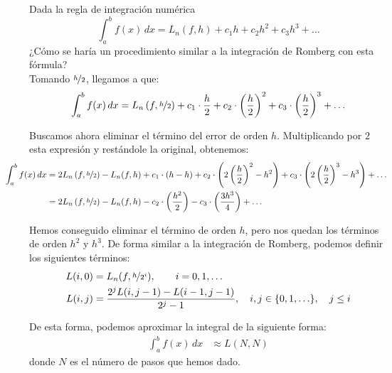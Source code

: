 \begin{ejercicio}
    Dada la regla de integración numérica
    \begin{equation*}
        \int_a^b f(x) \, dx = L_n(f, h) + c_1 h + c_2 h^2 + c_3 h^3 + \ldots
    \end{equation*}
    ¿Cómo se haría un procedimiento similar a la integración de Romberg con esta fórmula?\\


    Tomando $\nicefrac{h}{2}$, llegamos a que:
    \begin{align*}
        \int_a^b f(x) \, dx &= L_n\left(f,\nicefrac{h}{2}\right) + c_1 \cdot \frac{h}{2} + c_2 \cdot \left(\frac{h}{2}\right)^2 + c_3 \cdot \left(\frac{h}{2}\right)^3 + \ldots\\
    \end{align*}

    Buscamos ahora eliminar el término del error de orden $h$. Multiplicando por $2$ esta expresión y restándole la original, obtenemos:
    \begin{align*}
        \hspace{-1cm}\int_a^b f(x) \, dx &= 2L_n\left(f,\nicefrac{h}{2}\right) - L_n(f, h) + c_1 \cdot \left(h-h\right) + c_2 \cdot \left(2\left(\frac{h}{2}\right)^2 - h^2\right) + c_3 \cdot \left(2\left(\frac{h}{2}\right)^3 - h^3\right) + \ldots\\
        \hspace{-1cm}&= 2L_n\left(f,\nicefrac{h}{2}\right) - L_n(f, h) - c_2 \cdot \left(\frac{h^2}{2}\right) - c_3 \cdot \left(\frac{3h^3}{4}\right) + \ldots
    \end{align*}

    Hemos conseguido eliminar el término de orden $h$, pero nos quedan los términos de orden $h^2$ y $h^3$. De forma similar a la integración de Romberg, podemos definir los siguientes términos:
    \begin{align*}
        L(i,0) &= L_n(f, \nicefrac{h}{2^i}),\qquad i=0,1,\ldots\\
        L(i,j) &= \dfrac{2^jL(i,j-1)-L(i-1,j-1)}{2^j-1}, \quad i,j\in \{0,1,\ldots\}, \quad j\leq i\\
    \end{align*}

    De esta forma, podemos aproximar la integral de la siguiente forma:
    \begin{align*}
        \int_a^b f(x) \, dx &\approx L(N,N)
    \end{align*}
    donde $N$ es el número de pasos que hemos dado.
\end{ejercicio}